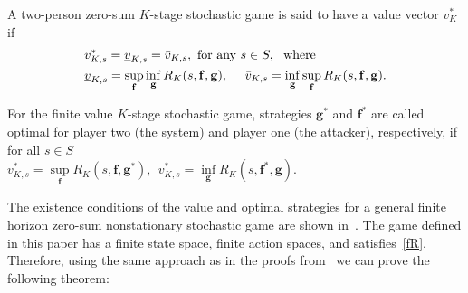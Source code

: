 \begin{definition}
A two-person zero-sum $K$-stage stochastic game 
is said to have a value vector $v^{*}_{K}$ if %
\begin{align*}
\begin{split}
&v^{*}_{K,s}=\underbar{$v$}_{K,s}=\bar{v}_{K,s},\ \text{for any}\ s\in S,\ \ \text{where}\\
&\underbar{$v$}_{K,s}= \sup_{\mathbf{f}}\inf_{\mathbf{g}}R_{K}(s,\mathbf{f}, \mathbf{g}),
~~~~\bar{v}_{K,s}=\inf_{\mathbf{g}}\sup_{\mathbf{f}}R_{K}(s,\mathbf{f},\mathbf{g}).
\end{split}
\end{align*}


For the finite value $K$-stage stochastic game, strategies $\mathbf{g}^{*}$ and $\mathbf{f}^{*}$ are called optimal for player two (the system) and player one (the attacker), respectively, if for all $s\in S$\\
$v^*_{K,s} = \sup\limits_{\mathbf{f}}R_{K}(s, \mathbf{f}, \mathbf{g}^{*}),%
~~v^*_{K,s} = \inf\limits_{\mathbf{g}}R_{K}(s, \mathbf{f}^{*}, \mathbf{g}). $%
\end{definition}

The existence conditions of the value and optimal strategies for a general finite horizon zero-sum nonstationary stochastic game are shown in~\cite{finite_exist}. The game defined in this paper has a finite state space, finite action spaces, and satisfies~\eqref{fR}.
Therefore, using the same approach as in the proofs from~\cite{finite_exist} we can prove the following theorem:

